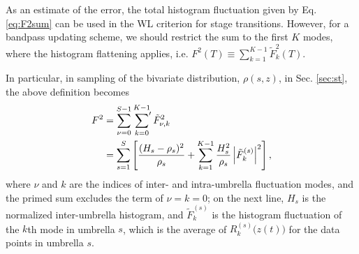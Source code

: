 \documentclass[reprint, superscriptaddress, floatfix]{revtex4-1}
\begin{document}

As an estimate of the error,
the total histogram fluctuation given by Eq. \eqref{eq:F2sum}
can be used in the WL criterion for stage transitions.
%
However, for a bandpass updating scheme,
we should restrict the sum to the first $K$ modes,
where the histogram flattening applies, i.e.
$F^2(T) \equiv \sum_{k = 1}^{K-1} \tilde F_k^2(T)$.
%

In particular,
in sampling of the bivariate distribution,
$\rho(s, z)$, in Sec. \ref{sec:st},
the above definition becomes
\begin{align}
  F^2
  &=
  \sum_{\nu = 0}^{S - 1}
  \sideset{}{'}\sum_{k = 0}^{K - 1}
  \tilde F_{\nu, k}^2
  \notag \\
  &=
  \sum_{s=1}^S
  \left[
  \frac{ (H_s - \rho_s)^2 } { \rho_s }
  +
  \sum_{k = 1}^{K - 1}
  \frac{ H_s^2 } { \rho_s }
  \left|{\tilde F}_k^{(s)} \right|^2
  \right]
  ,
  \label{eq:F2st}
\end{align}
where $\nu$ and $k$ are the indices of
inter- and intra-umbrella fluctuation modes,
and the primed sum excludes
the term of $\nu = k = 0$;
on the next line,
$H_s$ is the normalized inter-umbrella histogram,
and
$\tilde F_k^{(s)}$
is the histogram fluctuation of the $k$th mode in umbrella $s$,
which is the average of $R_k^{(s)}\bigl( z(t) \bigr)$
for the data points in umbrella $s$.
\end{document}
